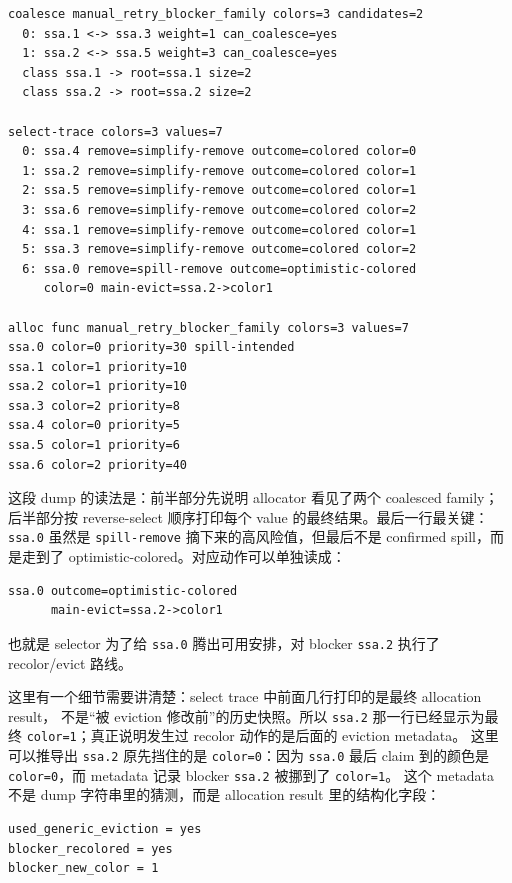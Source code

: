 \documentclass[UTF8,a4paper,11pt]{ctexart}
\begin{document}
\begin{lstlisting}[language={}]
coalesce manual_retry_blocker_family colors=3 candidates=2
  0: ssa.1 <-> ssa.3 weight=1 can_coalesce=yes
  1: ssa.2 <-> ssa.5 weight=3 can_coalesce=yes
  class ssa.1 -> root=ssa.1 size=2
  class ssa.2 -> root=ssa.2 size=2

select-trace colors=3 values=7
  0: ssa.4 remove=simplify-remove outcome=colored color=0
  1: ssa.2 remove=simplify-remove outcome=colored color=1
  2: ssa.5 remove=simplify-remove outcome=colored color=1
  3: ssa.6 remove=simplify-remove outcome=colored color=2
  4: ssa.1 remove=simplify-remove outcome=colored color=1
  5: ssa.3 remove=simplify-remove outcome=colored color=2
  6: ssa.0 remove=spill-remove outcome=optimistic-colored
     color=0 main-evict=ssa.2->color1

alloc func manual_retry_blocker_family colors=3 values=7
ssa.0 color=0 priority=30 spill-intended
ssa.1 color=1 priority=10
ssa.2 color=1 priority=10
ssa.3 color=2 priority=8
ssa.4 color=0 priority=5
ssa.5 color=1 priority=6
ssa.6 color=2 priority=40
\end{lstlisting}

这段 dump 的读法是：前半部分先说明 allocator 看见了两个 coalesced family；
后半部分按 reverse-select 顺序打印每个 value 的最终结果。最后一行最关键：
\texttt{ssa.0} 虽然是 \texttt{spill-remove} 摘下来的高风险值，但最后不是
confirmed spill，而是走到了 optimistic-colored。对应动作可以单独读成：

\begin{lstlisting}[language={}]
ssa.0 outcome=optimistic-colored
      main-evict=ssa.2->color1
\end{lstlisting}

也就是 selector 为了给 \texttt{ssa.0} 腾出可用安排，对 blocker \texttt{ssa.2} 执行了
recolor/evict 路线。

这里有一个细节需要讲清楚：select trace 中前面几行打印的是最终 allocation result，
不是“被 eviction 修改前”的历史快照。所以 \texttt{ssa.2} 那一行已经显示为最终
\texttt{color=1}；真正说明发生过 recolor 动作的是后面的 eviction metadata。
这里可以推导出 \texttt{ssa.2} 原先挡住的是 \texttt{color=0}：因为 \texttt{ssa.0}
最后 claim 到的颜色是 \texttt{color=0}，而 metadata 记录 blocker \texttt{ssa.2}
被挪到了 \texttt{color=1}。
这个 metadata 不是 dump 字符串里的猜测，而是 allocation result 里的结构化字段：

\begin{lstlisting}[language={}]
used_generic_eviction = yes
blocker_recolored = yes
blocker_new_color = 1
\end{lstlisting}
\end{document}

